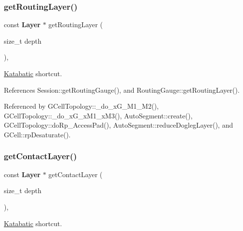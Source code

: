 \mbox{\label{classKatabatic_1_1Session_a3efd0f0d87be640dc566c1afd821e5e6}} 
\subsubsection{\texorpdfstring{get\+Routing\+Layer()}{getRoutingLayer()}}
{\footnotesize\ttfamily const \textbf{ Layer} $\ast$ get\+Routing\+Layer (\begin{DoxyParamCaption}\item[{size\+\_\+t}]{depth }\end{DoxyParamCaption})\hspace{0.3cm}{\ttfamily [inline]}, {\ttfamily [static]}}

\mbox{\hyperlink{namespaceKatabatic}{Katabatic}} shortcut. 

References Session\+::get\+Routing\+Gauge(), and Routing\+Gauge\+::get\+Routing\+Layer().



Referenced by G\+Cell\+Topology\+::\+\_\+do\+\_\+x\+G\+\_\+M1\+\_\+M2(), G\+Cell\+Topology\+::\+\_\+do\+\_\+x\+G\+\_\+x\+M1\+\_\+x\+M3(), Auto\+Segment\+::create(), G\+Cell\+Topology\+::do\+Rp\+\_\+\+Access\+Pad(), Auto\+Segment\+::reduce\+Dogleg\+Layer(), and G\+Cell\+::rp\+Desaturate().

\mbox{\label{classKatabatic_1_1Session_ad3ee60a34f480bd3aecd8c7d957ff52e}} 
\subsubsection{\texorpdfstring{get\+Contact\+Layer()}{getContactLayer()}}
{\footnotesize\ttfamily const \textbf{ Layer} $\ast$ get\+Contact\+Layer (\begin{DoxyParamCaption}\item[{size\+\_\+t}]{depth }\end{DoxyParamCaption})\hspace{0.3cm}{\ttfamily [inline]}, {\ttfamily [static]}}

\mbox{\hyperlink{namespaceKatabatic}{Katabatic}} shortcut. 

